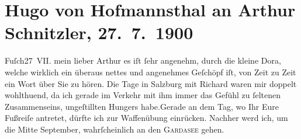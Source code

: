 

         
         \renewcommand{\erwaehntePersonen}{Personen: Richard Beer-Hofmann, Anna von Hofmannsthal, Hugo August von Hofmannsthal, Gertrude von Hofmannsthal, Dora Michaelis, Franziska Schlesinger}
         \renewcommand{\erwaehnteOrte}{Orte: Bad Fusch, Lago di Garda, Salzburg, Wien, Österreichischer Hof}
         \renewcommand{\erwaehnteWerke}{Werke: Frau Bertha Garlan. Roman, Lieutenant Gustl. Novelle}
               \section[Hugo von Hofmannsthal an Arthur Schnitzler, 27. 7. 1900]{ Hugo von Hofmannsthal an Arthur Schnitzler, 27. 7. 1900}\nopagebreak{}\rehead{ }\begin{ledgroupsized}[t]{13cm}\normalsize\beginnumbering \toendnotes[C]{\smallbreak\pagebreak[2]} 
\toendnotes[C]{\smallbreak}\pstart
           \raggedleft{}{\pb}Fuſch27 VII.\pend
           \pstart{}mein lieber Arthur \pend\pstart
           es iſt ſehr angenehm, durch die kleine Dora,
               welche wirklich ein überaus nettes und angenehmes Geſchöpf iſt, von Zeit zu Zeit ein
               Wort über Sie zu hören.\pend
           \pstart
           Die Tage in Salzburg mit Richard waren mir doppelt wohlthuend, da ich gerade im Verkehr
               mit ihm immer das Gefühl zu ſeltenen Zusammenseins, ungeſtillten {\pb}Hungers habe.\hspace*{1.5em}Gerade an dem Tag, wo Ihr Eure Fußreiſe antretet, dürfte ich zur
               Waffenübung einrücken. Nachher werd ich, um die Mitte September,
               wahrſcheinlich an den \textsc{Gardasee} gehen.\pend

\end{ledgroupsized}
